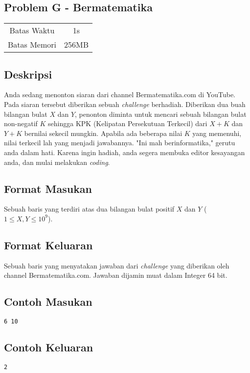 \documentclass{article}
\begin{document}
\begin{center}
    \section*{Problem G - Bermatematika} %

    \begin{tabular}{ | c c | }
        \hline
        Batas Waktu  & 1s \\    %
        Batas Memori & 256MB \\  %
        \hline
    \end{tabular}
\end{center}

\subsection*{Deskripsi}

Anda sedang menonton siaran dari channel Bermatematika.com di YouTube. Pada siaran tersebut diberikan sebuah \textit{challenge} berhadiah. Diberikan dua buah bilangan bulat $X$ dan $Y$, penonton diminta untuk mencari sebuah bilangan bulat non-negatif $K$ sehingga KPK (Kelipatan Persekutuan Terkecil) dari $X+K$ dan $Y+K$ bernilai sekecil mungkin. Apabila ada beberapa nilai $K$ yang memenuhi, nilai terkecil lah yang menjadi jawabannya. "Ini mah berinformatika," gerutu anda dalam hati. Karena ingin hadiah, anda segera membuka editor kesayangan anda, dan mulai melakukan \textit{coding}.

\subsection*{Format Masukan}

Sebuah baris yang terdiri atas dua bilangan bulat positif $X$ dan $Y$ ($1 \leq X, Y \leq 10^9$).

\subsection*{Format Keluaran}

Sebuah baris yang menyatakan jawaban dari \textit{challenge} yang diberikan oleh channel Bermatematika.com. Jawaban dijamin muat dalam Integer 64 bit.
\\

\begin{multicols}{2}
\subsection*{Contoh Masukan}
\begin{lstlisting}
6 10
\end{lstlisting}
\columnbreak
\subsection*{Contoh Keluaran}
\begin{lstlisting}
2
\end{lstlisting}
\vfill
\null
\end{multicols}
\end{document}
